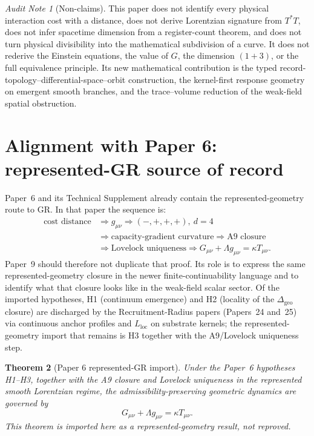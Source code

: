 \documentclass[11pt]{article}
\newtheorem{theorem}{Theorem}[section]
\theoremstyle{remark}
\newtheorem{audit}[theorem]{Audit Note}
\begin{document}
\begin{audit}[Non-claims]
This paper does not identify every physical interaction cost with a distance, does not derive Lorentzian signature from $T^*T$, does not infer spacetime dimension from a register-count theorem, and does not turn physical divisibility into the mathematical subdivision of a curve.  It does not rederive the Einstein equations, the value of $G$, the dimension $(1+3)$, or the full equivalence principle.  Its new mathematical contribution is the typed record-topology--differential-space--orbit construction, the kernel-first response geometry on emergent smooth branches, and the trace--volume reduction of the weak-field spatial obstruction.
\end{audit}

\section{Alignment with Paper 6: represented-GR source of record}
\label{sec:paper6-alignment}

Paper~6 and its Technical Supplement already contain the represented-geometry route to GR.  In that paper the sequence is:
\[
\begin{aligned}
\text{cost distance}
&\Rightarrow g_{\mu\nu}
\Rightarrow (-,+,+,+),\ d=4 \\
&\Rightarrow \text{capacity-gradient curvature}
\Rightarrow \text{A9 closure} \\
&\Rightarrow \text{Lovelock uniqueness}
\Rightarrow
G_{\mu\nu}+\Lambda g_{\mu\nu}=\kappa T_{\mu\nu}.
\end{aligned}
\]
Paper~9 should therefore not duplicate that proof.  Its role is to express the same represented-geometry closure in the newer finite-continuability language and to identify what that closure looks like in the weak-field scalar sector.  Of the imported hypotheses, H1 (continuum emergence) and H2 (locality of the $\Delta_{\mathrm{geo}}$ closure) are discharged by the Recruitment-Radius papers (Papers~24 and~25) via continuous anchor profiles and $L_{\mathrm{loc}}$ on substrate kernels; the represented-geometry import that remains is H3 together with the A9/Lovelock uniqueness step.

\begin{theorem}[Paper 6 represented-GR import]
\label{thm:paper6-gr-import}
Under the Paper~6 hypotheses H1--H3, together with the A9 closure and Lovelock uniqueness in the represented smooth Lorentzian regime, the admissibility-preserving geometric dynamics are governed by
\[
        G_{\mu\nu}+\Lambda g_{\mu\nu}=\kappa T_{\mu\nu}.
\]
This theorem is imported here as a represented-geometry result, not reproved.
\end{theorem}
\end{document}
